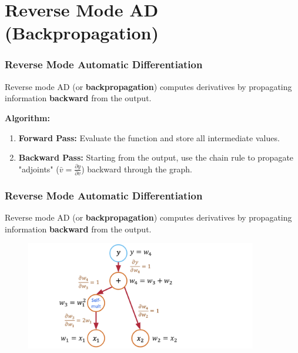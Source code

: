 \documentclass[notes]{beamer}
\begin{document}
\section{Reverse Mode AD (Backpropagation)}

\begin{frame}
\frametitle{Reverse Mode Automatic Differentiation}

Reverse mode AD (or \textbf{backpropagation}) computes derivatives by propagating information \textbf{backward} from the output.

\textbf{Algorithm:}
\begin{enumerate}
    \item \textbf{Forward Pass:} Evaluate the function and store all intermediate values.
    \item \textbf{Backward Pass:} Starting from the output, use the chain rule to propagate "adjoints" ($\bar{v} = \frac{\partial y}{\partial v}$) backward through the graph.
\end{enumerate}

\end{frame}

\begin{frame}
	\frametitle{Reverse Mode Automatic Differentiation}
	
	Reverse mode AD (or \textbf{backpropagation}) computes derivatives by propagating information \textbf{backward} from the output.
	
	\begin{figure}[ht]
		\centering
		\includegraphics[width=0.9\textwidth]{figs/ad4.png}
	\end{figure}
	
\end{frame}
\end{document}
